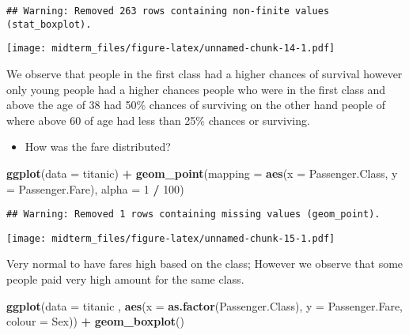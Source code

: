 \documentclass[]{article}
\newenvironment{Shaded}{\begin{snugshade}}{\end{snugshade}}
\newcommand{\DataTypeTok}[1]{\textcolor[rgb]{0.13,0.29,0.53}{#1}}
\newcommand{\DecValTok}[1]{\textcolor[rgb]{0.00,0.00,0.81}{#1}}
\newcommand{\KeywordTok}[1]{\textcolor[rgb]{0.13,0.29,0.53}{\textbf{#1}}}
\newcommand{\NormalTok}[1]{#1}
\newcommand{\OperatorTok}[1]{\textcolor[rgb]{0.81,0.36,0.00}{\textbf{#1}}}
\newcommand{\StringTok}[1]{\textcolor[rgb]{0.31,0.60,0.02}{#1}}
\providecommand{\tightlist}{%
  \setlength{\itemsep}{0pt}\setlength{\parskip}{0pt}}
\begin{document}
\begin{verbatim}
## Warning: Removed 263 rows containing non-finite values (stat_boxplot).
\end{verbatim}

\texttt{[image: midterm\_files/figure-latex/unnamed-chunk-14-1.pdf]}

We observe that people in the first class had a higher chances of
survival however only young people had a higher chances people who were
in the first class and above the age of 38 had 50\% chances of surviving
on the other hand people of where above 60 of age had less than 25\%
chances or surviving.

\begin{itemize}
\tightlist
\item
  How was the fare distributed?
\end{itemize}

\begin{Shaded}
\begin{Highlighting}[]
\KeywordTok{ggplot}\NormalTok{(}\DataTypeTok{data =}\NormalTok{ titanic) }\OperatorTok{+}\StringTok{ }
\StringTok{  }\KeywordTok{geom_point}\NormalTok{(}\DataTypeTok{mapping =} \KeywordTok{aes}\NormalTok{(}\DataTypeTok{x =}\NormalTok{ Passenger.Class, }\DataTypeTok{y =}\NormalTok{ Passenger.Fare), }\DataTypeTok{alpha =} \DecValTok{1} \OperatorTok{/}\StringTok{ }\DecValTok{100}\NormalTok{)}
\end{Highlighting}
\end{Shaded}

\begin{verbatim}
## Warning: Removed 1 rows containing missing values (geom_point).
\end{verbatim}

\texttt{[image: midterm\_files/figure-latex/unnamed-chunk-15-1.pdf]}

Very normal to have fares high based on the class; However we observe
that some people paid very high amount for the same class.

\begin{Shaded}
\begin{Highlighting}[]
\KeywordTok{ggplot}\NormalTok{(}\DataTypeTok{data =}\NormalTok{ titanic , }\KeywordTok{aes}\NormalTok{(}\DataTypeTok{x =} \KeywordTok{as.factor}\NormalTok{(Passenger.Class), }
                            \DataTypeTok{y =}\NormalTok{ Passenger.Fare, }\DataTypeTok{colour =}\NormalTok{ Sex)) }\OperatorTok{+}
\KeywordTok{geom_boxplot}\NormalTok{()}
\end{Highlighting}
\end{Shaded}
\end{document}
